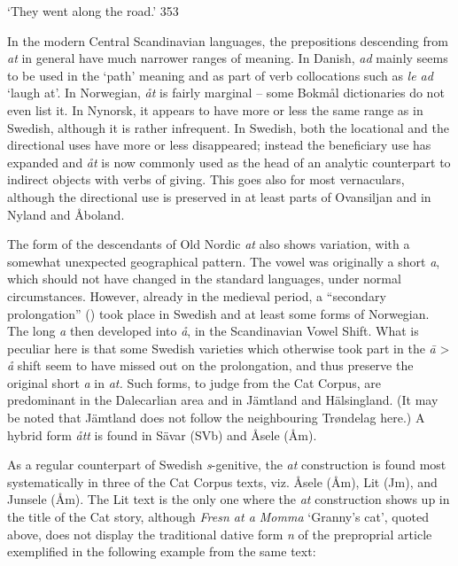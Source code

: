 \begin{styleTranslation}
‘They went along the road.’ 353

\end{styleTranslation}

\begin{styleBodyTextFirst}
In the modern Central Scandinavian languages, the prepositions descending from \textit{at} in general have much narrower ranges of meaning. In Danish, \textit{ad }mainly seems to be used in the ‘path’ meaning and as part of verb collocations such as \textit{le ad} ‘laugh at’. In Norwegian, \textit{åt} is fairly marginal – some Bokmål dictionaries do not even list it. In Nynorsk, it appears to have more or less the same range as in Swedish, although it is rather infrequent. In Swedish, both the locational and the directional uses have more or less disappeared; instead the beneficiary use has expanded and \textit{åt }is now commonly used as the head of an analytic counterpart to indirect objects with verbs of giving. This goes also for most vernaculars, although the directional use is preserved in at least parts of Ovansiljan and in Nyland and Åboland. 

\end{styleBodyTextFirst}

\begin{styleBodytextC}
The form of the descendants of Old Nordic \textit{at} also shows variation, with a somewhat unexpected geographical pattern. The vowel was originally a short \textit{a}, which should not have changed in the standard languages, under normal circumstances. However, already in the medieval period, a “secondary prolongation” (\citet[1204]{Hellquist1922}) took place in Swedish and at least some forms of Norwegian. The long \textit{a} then developed into \textit{å}, in the Scandinavian Vowel Shift. What is peculiar here is that some Swedish varieties which otherwise took part in the \textit{\=a }{\textgreater} \textit{å} shift seem to have missed out on the prolongation, and thus preserve the original short \textit{a }in\textit{ at.} Such forms, to judge from the Cat Corpus, are predominant in the Dalecarlian area and in Jämtland and Hälsingland. (It may be noted that Jämtland does not follow the neighbouring Trøndelag here.) A hybrid form \textit{ått} is found in Sävar (SVb) and Åsele (Åm). 

\end{styleBodytextC}

\begin{styleBodytextC}
As a regular counterpart of Swedish \textit{s}{}-genitive, the \textit{at} construction is\textit{ }found most systematically in three of the Cat Corpus texts, viz. Åsele (Åm), Lit (Jm), and Junsele (Åm). The Lit text is the only one where the \textit{at} construction shows up in the title of the Cat story, although \textit{Fresn at a Momma }‘Granny’s cat’, quoted above, does not display the traditional dative form \textit{n} of the preproprial article exemplified in the following example from the same text:

\end{styleBodytextC}


